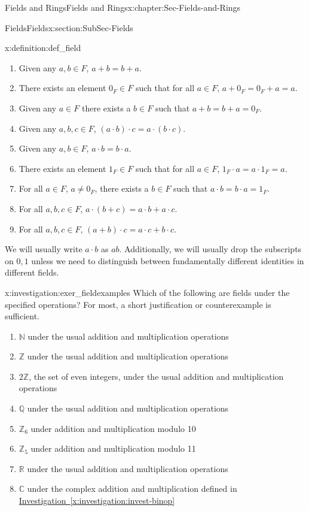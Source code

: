 \documentclass[oneside,10pt,]{book}
\newcommand{\xreffont}{\relax}
\numberwithin{equation}{section}
\def\C{{\mathbb C}}
\def\Z{{\mathbb Z}}
\def\Q{{\mathbb Q}}
\def\N{{\mathbb N}}
\def\R{{\mathbb R}}
\begin{document}
\begin{chapterptx}{Fields and Rings}{}{Fields and Rings}{}{}{x:chapter:Sec-Fields-and-Rings}
\begin{sectionptx}{Fields}{}{Fields}{}{}{x:section:SubSec-Fields}
\begin{definition}{}{x:definition:def_field}
\begin{enumerate}
\item{}Given any \(a,b\in F\), \(a+b= b+a\).%
\item{}There exists an element \(0_F\in F\) such that for all \(a\in F\), \(a+0_F = 0_F + a = a\).%
\item{}Given any \(a\in F\) there exists a \(b\in F\) such that \(a+b = b + a =0_F\).%
\item{}Given any \(a,b,c\in F\), \((a\cdot b)\cdot c = a\cdot (b\cdot c)\).%
\item{}Given any \(a,b\in F\), \(a\cdot b = b\cdot a\).%
\item{}There exists an element \(1_F\in F\) such that for all \(a\in F\), \(1_F\cdot a = a\cdot 1_F = a\).%
\item{}For all \(a\in F\), \(a\ne 0_F\), there exists a \(b\in F\) such that \(a\cdot b = b\cdot a = 1_F\).%
\item{}For all \(a,b,c\in F\), \(a\cdot (b+c) = a\cdot b + a\cdot c\).%
\item{}For all \(a,b,c\in F\), \((a+b)\cdot c = a\cdot c + b\cdot c\).%
\end{enumerate}
%
\end{definition}
We will usually write \(a\cdot b\) as \(ab\). Additionally, we will usually drop the subscripts on \(0,1\) unless we need to distinguish between fundamentally different identities in different fields.%
\begin{investigation}{}{x:investigation:exer_fieldexamples}%
Which of the following are fields under the specified operations? For most, a short justification or counterexample is sufficient.%
\begin{enumerate}
\item{}\(\N\) under the usual addition and multiplication operations%
\item{}\(\Z\) under the usual addition and multiplication operations%
\item{}\(2\Z\), the set of even integers, under the usual addition and multiplication operations%
\item{}\(\Q\) under the usual addition and multiplication operations%
\item{}\(\Z_{6}\) under addition and multiplication modulo 10%
\item{}\(\Z_{5}\) under addition and multiplication modulo 11%
\item{}\(\R\) under the usual addition and multiplication operations%
\item{}\(\C\) under the complex addition and multiplication defined in \hyperref[x:investigation:invest-binop]{Investigation~{\xreffont\ref{x:investigation:invest-binop}}}%

\end{enumerate}
\end{investigation}
\end{sectionptx}
\end{chapterptx}
\end{document}
